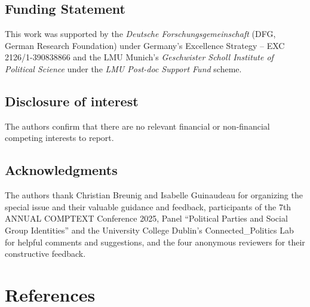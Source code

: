 \documentclass[12pt]{article}
\begin{document}
\medskip
\subsection*{Funding Statement}

This work was supported by 
the \textit{Deutsche Forschungsgemeinschaft} (DFG, German Research Foundation) under Germany's Excellence Strategy – EXC 2126/1-390838866
and 
the LMU Munich's \textit{Geschwister Scholl Institute of Political Science} under the \textit{LMU Post-doc Support Fund} scheme.

\subsection*{Disclosure of interest}

The authors confirm that there are no relevant financial or non-financial competing interests to report.

\subsection*{Acknowledgments}

The authors thank 
Christian Breunig and Isabelle Guinaudeau for organizing the special issue and their valuable guidance and feedback,
participants of the 7th ANNUAL COMPTEXT Conference 2025, Panel ``Political Parties and Social Group Identities'' and the University College Dublin's Connected\_Politics Lab for helpful comments and suggestions,
and 
the four anonymous reviewers for their constructive feedback.

\section{References}\label{references}

\begingroup
\end{document}
